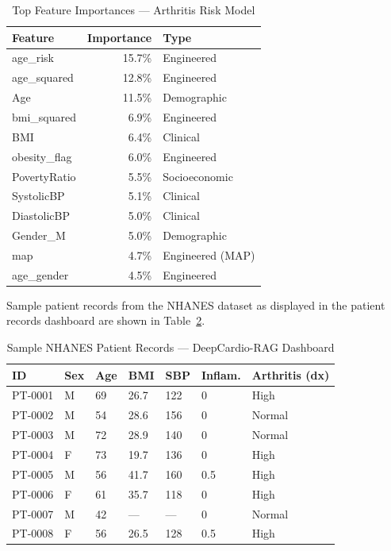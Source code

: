 \documentclass[AMA,STIX1COL,]{WileyNJD-v2}
\begin{document}
\begin{table}[!t]
\caption{Top Feature Importances — Arthritis Risk Model}
\label{tab:arfeat}
\centering
\renewcommand{\arraystretch}{1.1}
\small\begin{tabular}{lrp{2.4cm}}
\toprule
\textbf{Feature} & \textbf{Importance} & \textbf{Type}\\
\midrule
age\_risk        & 15.7\% & Engineered\\
age\_squared     & 12.8\% & Engineered\\
Age              & 11.5\% & Demographic\\
bmi\_squared     &  6.9\% & Engineered\\
BMI              &  6.4\% & Clinical\\
obesity\_flag    &  6.0\% & Engineered\\
PovertyRatio     &  5.5\% & Socioeconomic\\
SystolicBP       &  5.1\% & Clinical\\
DiastolicBP      &  5.0\% & Clinical\\
Gender\_M        &  5.0\% & Demographic\\
map              &  4.7\% & Engineered (MAP)\\
age\_gender      &  4.5\% & Engineered\\
\bottomrule
\end{tabular}
\end{table}

Sample patient records from the NHANES dataset as displayed in
the patient records dashboard are shown in Table~\ref{tab:ptrecords}.

\begin{table}[!t]
\caption{Sample NHANES Patient Records — DeepCardio-RAG Dashboard}
\label{tab:ptrecords}
\centering
\renewcommand{\arraystretch}{1.1}
\begin{tabular}{lllllll}
\toprule
\textbf{ID} & \textbf{Sex} & \textbf{Age} & \textbf{BMI} &
\textbf{SBP} & \textbf{Inflam.} & \textbf{Arthritis (dx)}\\
\midrule
PT-0001 & M & 69 & 26.7 & 122 & 0    & High\\
PT-0002 & M & 54 & 28.6 & 156 & 0    & Normal\\
PT-0003 & M & 72 & 28.9 & 140 & 0    & Normal\\
PT-0004 & F & 73 & 19.7 & 136 & 0    & High\\
PT-0005 & M & 56 & 41.7 & 160 & 0.5  & High\\
PT-0006 & F & 61 & 35.7 & 118 & 0    & High\\
PT-0007 & M & 42 & ---  & --- & 0    & Normal\\
PT-0008 & F & 56 & 26.5 & 128 & 0.5  & High\\
\bottomrule
\end{tabular}
\end{table}
\end{document}
